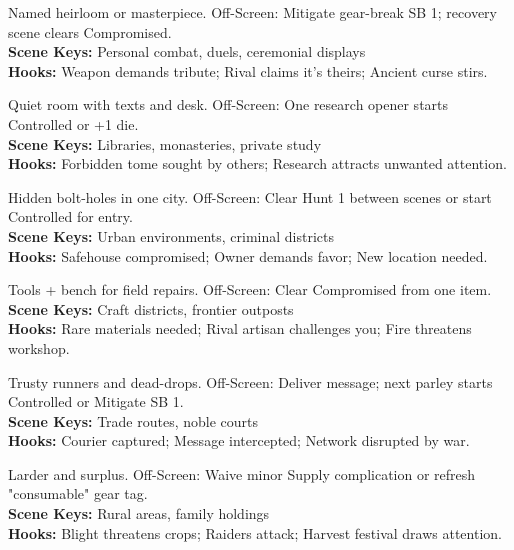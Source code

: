 \documentclass[12pt]{article}
\begin{document}
\begin{description}[leftmargin=*]
  \item[\textbf{Signature Weapon}] Named heirloom or masterpiece. Off-Screen: Mitigate gear-break SB 1; recovery scene clears Compromised. \\
  \textbf{Scene Keys:} Personal combat, duels, ceremonial displays \\
  \textbf{Hooks:} Weapon demands tribute; Rival claims it's theirs; Ancient curse stirs.

  \item[\textbf{Scholar's Cell}] Quiet room with texts and desk. Off-Screen: One research opener starts Controlled or +1 die. \\
  \textbf{Scene Keys:} Libraries, monasteries, private study \\
  \textbf{Hooks:} Forbidden tome sought by others; Research attracts unwanted attention.

  \item[\textbf{Safehouse Network}] Hidden bolt-holes in one city. Off-Screen: Clear Hunt 1 between scenes or start Controlled for entry. \\
  \textbf{Scene Keys:} Urban environments, criminal districts \\
  \textbf{Hooks:} Safehouse compromised; Owner demands favor; New location needed.

  \item[\textbf{Artisan's Workshop}] Tools + bench for field repairs. Off-Screen: Clear Compromised from one item. \\
  \textbf{Scene Keys:} Craft districts, frontier outposts \\
  \textbf{Hooks:} Rare materials needed; Rival artisan challenges you; Fire threatens workshop.

  \item[\textbf{Courier Network}] Trusty runners and dead-drops. Off-Screen: Deliver message; next parley starts Controlled or Mitigate SB 1. \\
  \textbf{Scene Keys:} Trade routes, noble courts \\
  \textbf{Hooks:} Courier captured; Message intercepted; Network disrupted by war.

  \item[\textbf{Small Farm/Orchard}] Larder and surplus. Off-Screen: Waive minor Supply complication or refresh "consumable" gear tag. \\
  \textbf{Scene Keys:} Rural areas, family holdings \\
  \textbf{Hooks:} Blight threatens crops; Raiders attack; Harvest festival draws attention.


\end{description}
\end{document}
